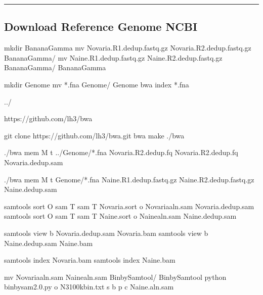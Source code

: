 \documentclass[letterpaper,10pt,english]{sphinxhowto}
\begin{document}
\bigskip\hrule\bigskip



\subsection{Download Reference Genome NCBI}
\label{\detokenize{CNV:download-reference-genome-ncbi}}
\sphinxAtStartPar
{}

\begin{sphinxVerbatim}[commandchars=\\\{\}]
mkdir BananaGamma
mv Novaria.R1.dedup.fastq.gz Novaria.R2.dedup.fastq.gz BananaGamma/
mv Naine.R1.dedup.fastq.gz Naine.R2.dedup.fastq.gz BananaGamma/
 BananaGamma

mkdir Genome
mv *.fna Genome/
 Genome bwa index *.fna

 ../

https://github.com/lh3/bwa

git clone https://github.com/lh3/bwa.git
 bwa make
./bwa

./bwa mem \PYGZhy{}M \PYGZhy{}t  ../Genome/*.fna Novaria.R2.dedup.fq Novaria.R2.dedup.fq \PYGZgt{} Novaria.dedup.sam

./bwa mem \PYGZhy{}M \PYGZhy{}t  Genome/*.fna Naine.R1.dedup.fastq.gz Naine.R2.dedup.fastq.gz \PYGZgt{} Naine.dedup.sam

samtools sort \PYGZhy{}O sam \PYGZhy{}T sam \PYGZhy{}T Novaria.sort \PYGZhy{}o Novaria\PYGZus{}aln.sam Novaria.dedup.sam
samtools sort \PYGZhy{}O sam \PYGZhy{}T sam \PYGZhy{}T Naine.sort \PYGZhy{}o Naine\PYGZus{}aln.sam Naine.dedup.sam

samtools view \PYGZhy{}b Novaria.dedup.sam \PYGZgt{} Novaria.bam
samtools view \PYGZhy{}b Naine.dedup.sam \PYGZgt{} Naine.bam

samtools index Novaria.bam
samtools index Naine.bam

mv Novaria\PYGZus{}aln.sam Naine\PYGZus{}aln.sam Bin\PYGZhy{}by\PYGZhy{}Sam\PYGZhy{}tool/
 Bin\PYGZhy{}by\PYGZhy{}Sam\PYGZhy{}tool
python bin\PYGZhy{}by\PYGZhy{}sam\PYGZus{}2.0.py \PYGZhy{}o N3\PYGZus{}100kbin.txt \PYGZhy{}s  \PYGZhy{}b \PYGZhy{}p  \PYGZhy{}c Naine\PYGZus{}.aln.sam
\end{sphinxVerbatim}
\end{document}
